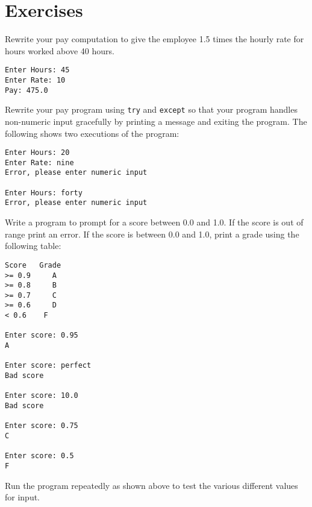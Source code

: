 \section{Exercises}

\begin{ex}
Rewrite your pay computation to give the employee 1.5 
times the hourly rate for 
hours worked above 40 hours.

\begin{verbatim}
Enter Hours: 45
Enter Rate: 10
Pay: 475.0
\end{verbatim}
\end{ex}

\begin{ex}
Rewrite your pay program using {\tt try} and {\tt except} 
so that your program handles non-numeric input gracefully
by printing a message and exiting the program.
The following shows two executions of the program:

\begin{verbatim}
Enter Hours: 20
Enter Rate: nine
Error, please enter numeric input

Enter Hours: forty
Error, please enter numeric input
\end{verbatim}
\end{ex}

\begin{ex}
Write a program to prompt for a score between 0.0 and 1.0.
If the score is out of range print an error.  If the score
is between 0.0 and 1.0, print a grade using the following 
table:

\begin{verbatim}
Score   Grade
>= 0.9     A
>= 0.8     B
>= 0.7     C
>= 0.6     D
< 0.6    F

Enter score: 0.95
A

Enter score: perfect
Bad score

Enter score: 10.0
Bad score

Enter score: 0.75
C

Enter score: 0.5
F
\end{verbatim}

Run the program repeatedly as shown above to test the 
various different values for input.
\end{ex}

